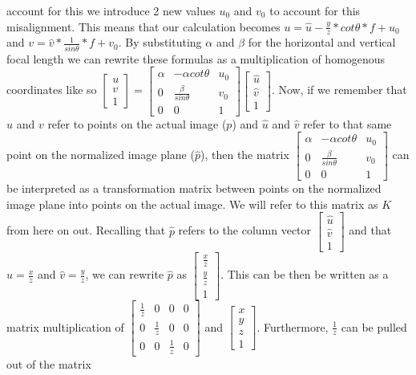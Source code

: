 account for this we introduce 2 new values $u_0$ and $v_0$ to account for this misalignment.  This means that our 
calculation becomes $u=\hat{u}-\frac{y}{z} * cot \theta * f + u_0$ and $v=\hat{v} * \frac{1}{sin \theta} * f + 
v_0$. By substituting $\alpha$ and $\beta$ for the horizontal and vertical focal length we can rewrite these formulas as a 
multiplication of homogenous coordinates like so $\begin{bmatrix} u \\ v \\ 1 \end{bmatrix} = \begin{bmatrix} \alpha & -\alpha 
cot\theta & u_{0} \\ 0 & \frac{\beta}{sin\theta} & v_{0} \\ 0 & 0 & 1 \end{bmatrix} \begin{bmatrix}\hat{u} \\ \hat{v}\\ 
1\end{bmatrix}$.  
Now, if we remember that $u$ and $v$ refer to points on the actual image ($p$) and $\hat{u}$ and $\hat{v}$ refer to that same point 
on the normalized image plane ($\hat{p}$), then the matrix $\begin{bmatrix} \alpha & -\alpha cot\theta & u_0 \\ 0 & \frac{\beta}
{sin\theta} & v_0 \\ 0 & 0 & 1 \end{bmatrix}$ can be interpreted as a transformation matrix between points on the normalized image 
plane into points on the actual image.  We will refer to this matrix as $K$ from here on out.  Recalling that $\hat{p}$ refers to 
the column vector $\begin{bmatrix} \hat{u} \\ \hat{v} \\ 1 \end{bmatrix}$ and that $\hat{u} = \frac{x}{z}$ and $\hat{v} = \frac{y}
{z}$, we can rewrite $\hat{p}$ as $\begin{bmatrix} \frac{x}{z} \\ \frac{y}{z} \\ 1 \end{bmatrix}$.  This can be then be written as 
a matrix multiplication of $\begin{bmatrix} \frac{1}{z} & 0 & 0 & 0 \\ 0 & \frac{1}{z} & 0 & 0 \\ 0 & 0 & \frac{1}{z} & 0 
\end{bmatrix}$ and $\begin{bmatrix} x \\ y \\ z \\ 1 \end{bmatrix}$.  Furthermore, $\frac{1}{z}$ can be pulled out of the matrix 
